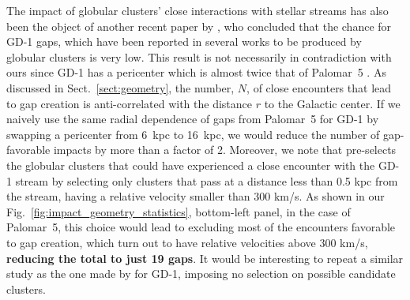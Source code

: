 \documentclass{aa}
\begin{document}
  The impact of globular clusters' close interactions with stellar streams has also been the object of another recent paper by \citet{2022ApJ...941..129D}, who concluded that the chance for GD-1 gaps, which have been reported in several works \citep[see, for example, ][]{2019ApJ...880...38B,2018MNRAS.477.1893D,2020AAS...23533607D} to be produced by globular clusters is very low. This result is not necessarily in contradiction with ours since GD-1 has a pericenter which is almost twice that of Palomar~5 \citep[see, for example][]{2019MNRAS.486.2995M}. As discussed in Sect.~\ref{sect:geometry}, the number, $N$, of close encounters that lead to gap creation is anti-correlated with the distance $r$ to the Galactic center. If we naively use the same radial dependence of gaps from Palomar~5 for GD-1 by swapping a pericenter from 6~kpc to 16~kpc, we would reduce the number of gap-favorable impacts by more than a factor of 2. Moreover, we note that \citet{2022ApJ...941..129D} pre-selects the globular clusters that could have experienced a close encounter with the GD-1 stream by selecting only clusters that pass at a distance less than 0.5 kpc from the stream, having a relative velocity smaller than  300 km/s. As shown in our Fig.~\ref{fig:impact_geometry_statistics}, bottom-left panel, in the case of Palomar~5, this choice would lead to excluding most of the encounters favorable to gap creation, which turn out to have relative velocities above 300 km/s, \textbf{reducing the total to just 19 gaps}. It would be interesting to repeat a similar study as the one made by \citet{2022ApJ...941..129D} for GD-1, imposing no selection on possible candidate clusters.\\
  
\end{document}
